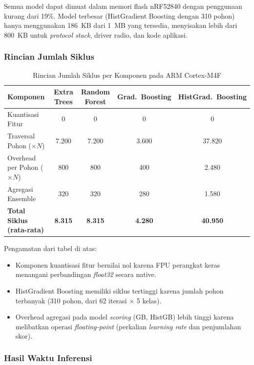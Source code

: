 Semua model dapat dimuat dalam memori flash nRF52840 dengan penggunaan kurang dari 19\%. Model terbesar (HistGradient Boosting dengan 310 pohon) hanya menggunakan 186~KB dari 1~MB yang tersedia, menyisakan lebih dari 800~KB untuk \textit{protocol stack}, driver radio, dan kode aplikasi.

\subsubsection{Rincian Jumlah Siklus}

\begin{table}[htbp]
\centering
\caption{Rincian Jumlah Siklus per Komponen pada ARM Cortex-M4F}
\label{tab:arm_cycles_detail}
\begin{tabular}{lcccc}
\hline
\textbf{Komponen} & \textbf{Extra Trees} & \textbf{Random Forest} & \textbf{Grad.\ Boosting} & \textbf{HistGrad.\ Boosting} \\
\hline
Kuantisasi Fitur & 0 & 0 & 0 & 0 \\
Traversal Pohon ($\times N$) & 7.200 & 7.200 & 3.600 & 37.820 \\
Overhead per Pohon ($\times N$) & 800 & 800 & 400 & 2.480 \\
Agregasi Ensemble & 320 & 320 & 280 & 1.580 \\
\textbf{Total Siklus (rata-rata)} & \textbf{8.315} & \textbf{8.315} & \textbf{4.280} & \textbf{40.950} \\
\hline
\end{tabular}
\end{table}

Pengamatan dari tabel di atas:
\begin{itemize}
    \item Komponen kuantisasi fitur bernilai nol karena FPU perangkat keras menangani perbandingan \textit{float32} secara native.
    \item HistGradient Boosting memiliki siklus tertinggi karena jumlah pohon terbanyak (310 pohon, dari 62 iterasi $\times$ 5 kelas).
    \item Overhead agregasi pada model \textit{scoring} (GB, HistGB) lebih tinggi karena melibatkan operasi \textit{floating-point} (perkalian \textit{learning rate} dan penjumlahan skor).
\end{itemize}

\subsubsection{Hasil Waktu Inferensi}

